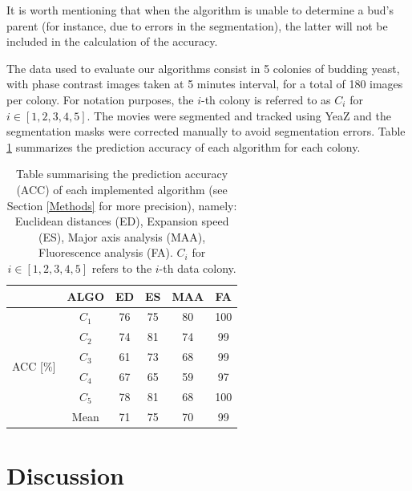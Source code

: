 \documentclass{TP}
\begin{document}
It is worth mentioning that when the algorithm is unable to determine a bud's parent (for instance, due to errors in the segmentation), the latter will not be included in the calculation of the accuracy.

The data used to evaluate our algorithms consist in 5 colonies of budding yeast, with phase contrast images taken at 5 minutes interval, for a total of 180 images per colony. For notation purposes, the $i$-th colony is referred to as $C_i$ for $i \in [1,2,3,4,5]$. The movies were segmented and tracked using YeaZ and the segmentation masks were corrected manually to avoid segmentation errors. Table \ref{tab: acc} summarizes the prediction accuracy of each algorithm for each colony.


\begin{table}[H]
\begin{tabular}{cc||c|c|c|c}
& ALGO & ED & ES & MAA & FA \\ \hline \hline
\multicolumn{1}{c|}{\multirow{6}{*}{ACC [$\%$]}} & $C_1$  &  76  &  75  & 80     &  100 \\ \cline{2-6} 
\multicolumn{1}{c|}{}                          & $C_2$  &  74  &  81  & 74     &   99  \\ \cline{2-6} 
\multicolumn{1}{c|}{}                          & $C_3$  &  61  &  73  &   68   &   99  \\ \cline{2-6} 
\multicolumn{1}{c|}{}                          & $C_4$  &  67  &  65  &   59   &   97  \\ \cline{2-6} 
\multicolumn{1}{c|}{}                          & $C_5$  &  78  & 81  &   68   &  100   \\ \cline{2-6} 
\multicolumn{1}{c|}{}                          & Mean   &  71  &  75  & 70    & 99    \\ 
\end{tabular}
\captionsetup{justification=raggedright}
\caption{Table summarising the prediction accuracy (ACC) of each implemented algorithm (see Section \ref{Methods} for more precision), namely: Euclidean distances (ED), Expansion speed (ES), Major axis analysis (MAA), Fluorescence analysis (FA). $C_i$ for $i \in [1,2,3,4,5]$ refers to the $i$-th data colony.} 
\label{tab: acc}
\end{table}

\section{Discussion}
\label{Discussion}
\end{document}
